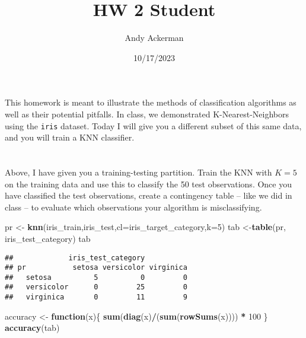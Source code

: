 \documentclass[
]{article}
\title{HW 2 Student}
\author{Andy Ackerman}
\date{10/17/2023}
\newenvironment{Shaded}{\begin{snugshade}}{\end{snugshade}}
\newcommand{\AttributeTok}[1]{\textcolor[rgb]{0.13,0.29,0.53}{#1}}
\newcommand{\ControlFlowTok}[1]{\textcolor[rgb]{0.13,0.29,0.53}{\textbf{#1}}}
\newcommand{\DecValTok}[1]{\textcolor[rgb]{0.00,0.00,0.81}{#1}}
\newcommand{\FunctionTok}[1]{\textcolor[rgb]{0.13,0.29,0.53}{\textbf{#1}}}
\newcommand{\NormalTok}[1]{#1}
\newcommand{\OtherTok}[1]{\textcolor[rgb]{0.56,0.35,0.01}{#1}}
\newcommand{\SpecialCharTok}[1]{\textcolor[rgb]{0.81,0.36,0.00}{\textbf{#1}}}
\begin{document}
\maketitle

This homework is meant to illustrate the methods of classification
algorithms as well as their potential pitfalls. In class, we
demonstrated K-Nearest-Neighbors using the \texttt{iris} dataset. Today
I will give you a different subset of this same data, and you will train
a KNN classifier.

\hypertarget{section}{%
\section{}\label{section}}

Above, I have given you a training-testing partition. Train the KNN with
\(K = 5\) on the training data and use this to classify the 50 test
observations. Once you have classified the test observations, create a
contingency table -- like we did in class -- to evaluate which
observations your algorithm is misclassifying.

\begin{Shaded}
\begin{Highlighting}[]
\NormalTok{pr }\OtherTok{\textless{}{-}} \FunctionTok{knn}\NormalTok{(iris\_train,iris\_test,}\AttributeTok{cl=}\NormalTok{iris\_target\_category,}\AttributeTok{k=}\DecValTok{5}\NormalTok{)}
\NormalTok{tab }\OtherTok{\textless{}{-}}\FunctionTok{table}\NormalTok{(pr, iris\_test\_category)}
\NormalTok{tab}
\end{Highlighting}
\end{Shaded}

\begin{verbatim}
##             iris_test_category
## pr           setosa versicolor virginica
##   setosa          5          0         0
##   versicolor      0         25         0
##   virginica       0         11         9
\end{verbatim}

\begin{Shaded}
\begin{Highlighting}[]
\NormalTok{accuracy }\OtherTok{\textless{}{-}} \ControlFlowTok{function}\NormalTok{(x)\{}
  \FunctionTok{sum}\NormalTok{(}\FunctionTok{diag}\NormalTok{(x)}\SpecialCharTok{/}\NormalTok{(}\FunctionTok{sum}\NormalTok{(}\FunctionTok{rowSums}\NormalTok{(x)))) }\SpecialCharTok{*} \DecValTok{100}
\NormalTok{\}}
\FunctionTok{accuracy}\NormalTok{(tab)}
\end{Highlighting}
\end{Shaded}
\end{document}
